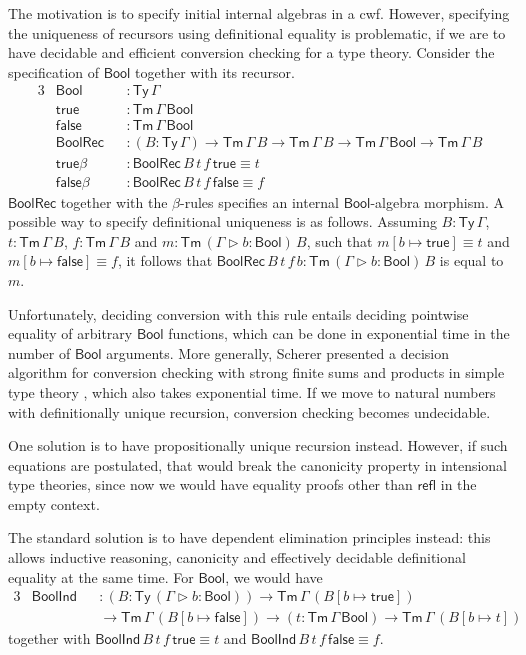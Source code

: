 \documentclass[12pt,a4paper,twoside,openany]{book}
\theoremstyle{remark}
\theoremstyle{definition}
\theoremstyle{theorem}
\newcommand{\ms}[1]{\mathsf{#1}}
\newcommand{\refl}{\mathsf{refl}}
\newcommand{\Tm}{\mathsf{Tm}}
\newcommand{\Ty}{\mathsf{Ty}}
\newcommand{\ext}{\triangleright}
\newcommand{\Bool}{\ms{Bool}}
\newcommand{\true}{\ms{true}}
\newcommand{\false}{\ms{false}}
\begin{document}
The motivation is to specify initial internal algebras in a cwf. However,
specifying the uniqueness of recursors using definitional equality is
problematic, if we are to have decidable and efficient conversion checking for a
type theory. Consider the specification of $\Bool$ together with its recursor.
\begin{alignat*}{3}
  & \Bool  &&: \Ty\,\Gamma \\
  & \true  &&: \Tm\,\Gamma\,\Bool \\
  & \false &&: \Tm\,\Gamma\,\Bool \\
  & \ms{BoolRec} &&: (B : \Ty\,\Gamma)\to \Tm\,\Gamma\,B \to \Tm\,\Gamma\,B \to \Tm\,\Gamma\,\Bool \to \Tm\,\Gamma\,B\\
  & \true\beta &&: \ms{BoolRec}\,B\,t\,f\,\true \equiv t\\
  & \false\beta &&: \ms{BoolRec}\,B\,t\,f\,\false \equiv f
\end{alignat*}
$\ms{BoolRec}$ together with the $\beta$-rules specifies an internal
$\Bool$-algebra morphism. A possible way to specify definitional uniqueness is
as follows. Assuming $B : \Ty\,\Gamma$, $t : \Tm\,\Gamma\,B$, $f :
\Tm\,\Gamma\,B$ and $m : \Tm\,(\Gamma\ext b : \Bool)\,B$, such that $m[b \mapsto
  \true] \equiv t$ and $m[b \mapsto \false] \equiv f$, it follows that
$\ms{BoolRec}\,B\,t\,f\,b : \Tm\,(\Gamma\ext b : \Bool)\,B$ is equal to $m$.

Unfortunately, deciding conversion with this rule entails deciding pointwise
equality of arbitrary $\Bool$ functions, which can be done in exponential time
in the number of $\Bool$ arguments. More generally, Scherer presented a decision
algorithm for conversion checking with strong finite sums and products in simple
type theory \cite{scherer17deciding}, which also takes exponential time. If we
move to natural numbers with definitionally unique recursion, conversion
checking becomes undecidable.

One solution is to have propositionally unique recursion instead. However, if
such equations are postulated, that would break the canonicity property in
intensional type theories, since now we would have equality proofs other than
$\refl$ in the empty context.

The standard solution is to have dependent elimination principles instead: this
allows inductive reasoning, canonicity and effectively decidable definitional
equality at the same time. For $\Bool$, we would have
\begin{alignat*}{3}
  & \ms{BoolInd} &&: (B : \Ty\,(\Gamma\ext b : \Bool)) \to \Tm\,\Gamma\,(B[b \mapsto \true])\\
  & &&\to \Tm\,\Gamma\,(B[b \mapsto \false]) \to (t : \Tm\,\Gamma\,\Bool) \to \Tm\,\Gamma\,(B[b \mapsto t])
\end{alignat*}
together with $\ms{BoolInd}\,B\,t\,f\,\true \equiv t$ and $\ms{BoolInd}\,B\,t\,f\,\false \equiv f$.
\end{document}
